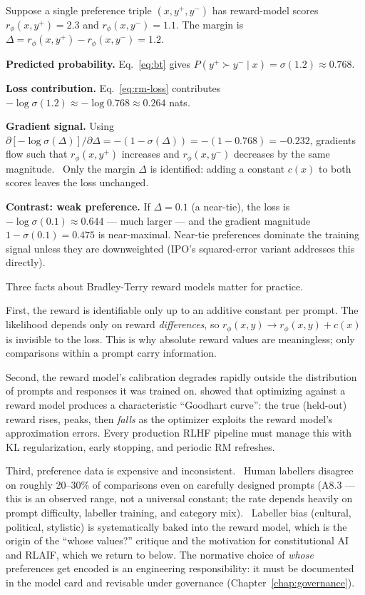 \begin{workedexample}
Suppose a single preference triple $(x, y^+, y^-)$ has reward-model
scores $r_\phi(x, y^+) = 2.3$ and $r_\phi(x, y^-) = 1.1$. The
margin is $\Delta = r_\phi(x,y^+) - r_\phi(x,y^-) = 1.2$.

\textbf{Predicted probability.} Eq.~\eqref{eq:bt} gives
$P(y^+ \succ y^-\mid x) = \sigma(1.2) \approx 0.768$.

\textbf{Loss contribution.} Eq.~\eqref{eq:rm-loss} contributes
$-\log\sigma(1.2) \approx -\log 0.768 \approx 0.264$ nats.

\textbf{Gradient signal.} Using $\partial[-\log\sigma(\Delta)]/\partial\Delta
= -(1-\sigma(\Delta)) = -(1 - 0.768) = -0.232$, gradients flow such
that $r_\phi(x,y^+)$ increases and $r_\phi(x,y^-)$ decreases by the
same magnitude. \Ident\ Only the margin $\Delta$ is identified:
adding a constant $c(x)$ to both scores leaves the loss unchanged.

\textbf{Contrast: weak preference.} If $\Delta = 0.1$ (a near-tie),
the loss is $-\log\sigma(0.1) \approx 0.644$ --- much larger ---
and the gradient magnitude $1-\sigma(0.1) = 0.475$ is near-maximal.
Near-tie preferences dominate the training signal unless they are
downweighted (IPO's squared-error variant addresses this directly).
\end{workedexample}

Three facts about Bradley-Terry reward models matter for practice.

First, the reward is identifiable only up to an additive constant
per prompt. The likelihood depends only on reward \emph{differences},
so $r_\phi(x, y) \to r_\phi(x, y) + c(x)$ is invisible to the loss.
This is why absolute reward values are meaningless; only
comparisons within a prompt carry information.

Second, the reward model's calibration degrades rapidly outside the
distribution of prompts and responses it was trained on.
\citet{gao2023scaling} showed that optimizing against a reward
model produces a characteristic ``Goodhart curve'': the true
(held-out) reward rises, peaks, then \emph{falls} as the optimizer
exploits the reward model's approximation errors. Every production
RLHF pipeline must manage this with KL regularization, early
stopping, and periodic RM refreshes.

Third, preference data is expensive and inconsistent. \Emp\ Human
labellers disagree on roughly 20--30\% of comparisons even on
carefully designed prompts (A8.3 --- this is an observed range, not
a universal constant; the rate depends heavily on prompt
difficulty, labeller training, and category mix). \Norm\ Labeller
bias (cultural, political, stylistic) is systematically baked into
the reward model, which is the origin of the ``whose values?''
critique and the motivation for constitutional AI and RLAIF, which
we return to below. The normative choice of \emph{whose}
preferences get encoded is an engineering responsibility: it must be
documented in the model card and revisable under governance
(Chapter~\ref{chap:governance}).

